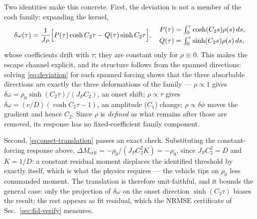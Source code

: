 Two identities make this concrete. First, the deviation is not a member
of the cosh family: expanding the kernel,
\begin{equation}
  \delta\omega(\tau) = \frac{1}{J_P}\Bigl[P(\tau)\cosh C_2\tau
    - Q(\tau)\sinh C_2\tau\Bigr],
  \quad
  \begin{aligned}
    P(\tau) &= \textstyle\int_0^\tau \cosh(C_2 s)\rho(s)\,ds,\\
    Q(\tau) &= \textstyle\int_0^\tau \sinh(C_2 s)\rho(s)\,ds,
  \end{aligned}
  \label{eq:drifting-coeffs}
\end{equation}
whose coefficients drift with $\tau$; they are constant only for
$\rho\equiv0$. This makes the escape channel explicit, and its structure follows from
the spanned directions: solving \eqref{eq:deviation} for each
spanned forcing shows that the three absorbable directions are exactly
the three deformations of the family — $\rho\propto1$ gives
$\delta\omega = \rho_0\sinh(C_2\tau)/(J_PC_2)$, an onset shift;
$\rho\propto\tau$ gives $\delta\omega = (c/D)(\cosh C_2\tau - 1)$, an
amplitude ($C_1$) change; $\rho\propto\delta\phi$ moves the gradient and
hence $C_2$. Since $\rho$ is \emph{defined} as what remains after those
are removed, its response has no fixed-coefficient family component.

Second, \eqref{eq:onset-translation} passes an exact check. Substituting
the constant-forcing response above,
$\Delta M_{\mathrm{crit}} = -\rho_0/(J_PC_2^2 K) = -\rho_0$, since
$J_PC_2^2 = D$ and $K = 1/D$: a constant residual moment displaces the
identified threshold by exactly itself, which is what the physics
requires — the vehicle tips on $\rho_0$ less commanded moment. The
translation is therefore unit-faithful, and it bounds the general case:
only the projection of $\delta\omega$ on the onset direction
$\sinh(C_2\tau)$ biases the result; the rest appears as fit residual,
which the NRMSE certificate of Sec.~\ref{sec:fid-verify} measures.

